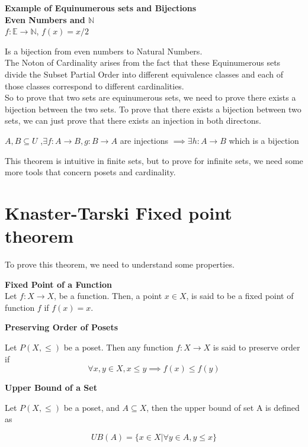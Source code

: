 \textbf{Example of Equinumerous sets and Bijections}\\

\textbf{Even Numbers and $\mathbb{N}$}\\

$f:\mathbb{E} \to \mathbb{N}$,  $f(x) = x/2$

Is a bijection from even numbers to Natural Numbers.\\

The Noton of Cardinality arises from the fact that these Equinumerous sets divide the Subset Partial Order into different equivalence classes and each of those classes correspond to different cardinalities. \\

So to prove that two sets are equinumerous sets, we need to prove there exists a bijection between the two sets. To prove that there exists a bijection between two sets, we can just prove that there exists an injection in both directons.

\begin{theorem}
$A,B \subseteq U$ ,$\exists f:A \to B, g:B \to A$ are injections $\implies \exists h:A \to B$ which is a bijection 
\end{theorem}

This theorem is intuitive in finite sets, but to prove for infinite sets, we need some more tools that concern posets and cardinality.

\section{Knaster-Tarski Fixed point theorem}

To prove this theorem, we need to understand some properties.

\textbf{Fixed Point of a Function}\\
Let $f: X \to X$, be a function. Then, a point $x \in X$, is said to be a fixed point of function $f$ if $f(x) = x$.

\textbf{Preserving Order of Posets}

Let $P(X,\le)$ be a poset. Then any function $f: X \to X$ is said to preserve order if 
$$ \forall x,y \in X, x \le y \implies f(x)  \le f(y) $$

\textbf{Upper Bound of a Set}

Let $P(X,\le)$ be a poset, and $A \subseteq X$, then the upper bound of set A is defined as 

$$ UB(A) = \{x \in X | \forall y \in A, y \le x\} $$

